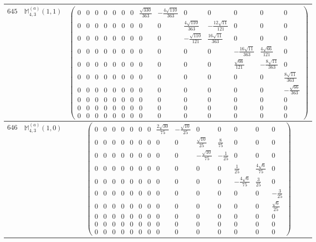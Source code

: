 \documentclass[fleqn,8pt,landscape]{jsarticle}
\begin{document}
\begin{center}
\begin{longtable}{ccc}
$ 645 $ & $ \mathbb{M}_{4,3}^{(a)}(1,1) $ & $ \begin{pmatrix} 0 & 0 & 0 & 0 & 0 & 0 & 0 & \frac{\sqrt{330}}{363} & - \frac{4 \sqrt{110}}{363} & 0 & 0 & 0 & 0 & 0 \\ 0 & 0 & 0 & 0 & 0 & 0 & 0 & 0 & 0 & \frac{4 \sqrt{110}}{363} & - \frac{12 \sqrt{11}}{121} & 0 & 0 & 0 \\ 0 & 0 & 0 & 0 & 0 & 0 & 0 & 0 & 0 & - \frac{\sqrt{110}}{121} & \frac{16 \sqrt{11}}{363} & 0 & 0 & 0 \\ 0 & 0 & 0 & 0 & 0 & 0 & 0 & 0 & 0 & 0 & 0 & - \frac{16 \sqrt{11}}{363} & \frac{4 \sqrt{66}}{121} & 0 \\ 0 & 0 & 0 & 0 & 0 & 0 & 0 & 0 & 0 & 0 & 0 & \frac{\sqrt{66}}{121} & - \frac{8 \sqrt{11}}{363} & 0 \\ 0 & 0 & 0 & 0 & 0 & 0 & 0 & 0 & 0 & 0 & 0 & 0 & 0 & \frac{8 \sqrt{11}}{363} \\ 0 & 0 & 0 & 0 & 0 & 0 & 0 & 0 & 0 & 0 & 0 & 0 & 0 & - \frac{\sqrt{66}}{363} \\ 0 & 0 & 0 & 0 & 0 & 0 & 0 & 0 & 0 & 0 & 0 & 0 & 0 & 0 \\ 0 & 0 & 0 & 0 & 0 & 0 & 0 & 0 & 0 & 0 & 0 & 0 & 0 & 0 \\ 0 & 0 & 0 & 0 & 0 & 0 & 0 & 0 & 0 & 0 & 0 & 0 & 0 & 0 \end{pmatrix} $ \\ \hline
$ 646 $ & $ \mathbb{M}_{4,3}^{(a)}(1,0) $ & $ \begin{pmatrix} 0 & 0 & 0 & 0 & 0 & 0 & 0 & \frac{2 \sqrt{30}}{75} & - \frac{\sqrt{10}}{25} & 0 & 0 & 0 & 0 & 0 \\ 0 & 0 & 0 & 0 & 0 & 0 & 0 & 0 & 0 & \frac{\sqrt{10}}{25} & \frac{8}{75} & 0 & 0 & 0 \\ 0 & 0 & 0 & 0 & 0 & 0 & 0 & 0 & 0 & - \frac{\sqrt{10}}{75} & - \frac{1}{25} & 0 & 0 & 0 \\ 0 & 0 & 0 & 0 & 0 & 0 & 0 & 0 & 0 & 0 & 0 & \frac{1}{25} & \frac{4 \sqrt{6}}{75} & 0 \\ 0 & 0 & 0 & 0 & 0 & 0 & 0 & 0 & 0 & 0 & 0 & - \frac{4 \sqrt{6}}{75} & \frac{3}{25} & 0 \\ 0 & 0 & 0 & 0 & 0 & 0 & 0 & 0 & 0 & 0 & 0 & 0 & 0 & - \frac{3}{25} \\ 0 & 0 & 0 & 0 & 0 & 0 & 0 & 0 & 0 & 0 & 0 & 0 & 0 & \frac{\sqrt{6}}{25} \\ 0 & 0 & 0 & 0 & 0 & 0 & 0 & 0 & 0 & 0 & 0 & 0 & 0 & 0 \\ 0 & 0 & 0 & 0 & 0 & 0 & 0 & 0 & 0 & 0 & 0 & 0 & 0 & 0 \\ 0 & 0 & 0 & 0 & 0 & 0 & 0 & 0 & 0 & 0 & 0 & 0 & 0 & 0 \end{pmatrix} $ \\ \hline

\end{longtable}
\end{center}
\end{document}
